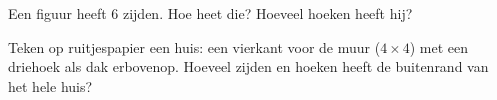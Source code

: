 \begin{exercise}[$\star$]\label{exo:g2:shapes:9}
Een figuur heeft $6$ zijden. Hoe heet die? Hoeveel hoeken heeft hij?
\end{exercise}

\begin{exercise}[$\star\star$]\label{exo:g2:shapes:10}
Teken op ruitjespapier een huis: een vierkant voor de muur
($4 \times 4$) met een driehoek als dak erbovenop. Hoeveel zijden en
hoeken heeft de buitenrand van het hele huis?
\end{exercise}
